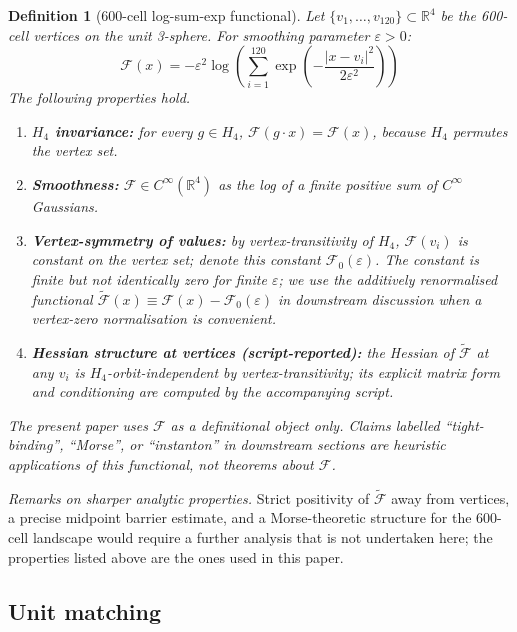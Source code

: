\documentclass[12pt]{article}
\newtheorem{definition}[theorem]{Definition}
\newcommand{\Fcal}{\mathcal{F}}
\begin{document}
\begin{definition}[600-cell log-sum-exp functional]\label{def:F600}
Let $\{v_1, \ldots, v_{120}\} \subset \mathbb{R}^4$ be the 600-cell vertices on the unit 3-sphere. For smoothing parameter $\varepsilon > 0$:
\begin{equation}\label{eq:F}
    \Fcal(x) = -\varepsilon^2 \log\!\left(\sum_{i=1}^{120} \exp\!\left(-\frac{|x - v_i|^2}{2\varepsilon^2}\right)\right)
\end{equation}
The following properties hold.
\begin{enumerate}
    \item[(i)] \textbf{$H_4$ invariance:} for every $g \in H_4$, $\Fcal(g \cdot x) = \Fcal(x)$, because $H_4$ permutes the vertex set.
    \item[(ii)] \textbf{Smoothness:} $\Fcal \in C^\infty(\mathbb{R}^4)$ as the log of a finite positive sum of $C^\infty$ Gaussians.
    \item[(iii)] \textbf{Vertex-symmetry of values:} by vertex-transitivity of $H_4$, $\Fcal(v_i)$ is constant on the vertex set; denote this constant $\Fcal_0(\varepsilon)$. The constant is finite but not identically zero for finite $\varepsilon$; we use the additively renormalised functional $\widetilde{\Fcal}(x) \equiv \Fcal(x) - \Fcal_0(\varepsilon)$ in downstream discussion when a vertex-zero normalisation is convenient.
    \item[(iv)] \textbf{Hessian structure at vertices (script-reported):} the Hessian of $\widetilde{\Fcal}$ at any $v_i$ is $H_4$-orbit-independent by vertex-transitivity; its explicit matrix form and conditioning are computed by the accompanying script.
\end{enumerate}
The present paper uses $\Fcal$ as a definitional object only. Claims labelled ``tight-binding'', ``Morse'', or ``instanton'' in downstream sections are heuristic applications of this functional, not theorems about $\Fcal$.
\end{definition}

\textit{Remarks on sharper analytic properties.} Strict positivity of $\widetilde{\Fcal}$ away from vertices, a precise midpoint barrier estimate, and a Morse-theoretic structure for the 600-cell landscape would require a further analysis that is not undertaken here; the properties listed above are the ones used in this paper.

\subsection{Unit matching}
\end{document}
